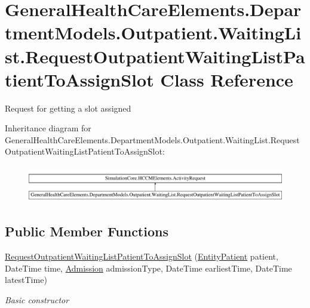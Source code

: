 \hypertarget{class_general_health_care_elements_1_1_department_models_1_1_outpatient_1_1_waiting_list_1_1_reqf0cf500ea28fd461b6ca502bac291525}{}\section{General\+Health\+Care\+Elements.\+Department\+Models.\+Outpatient.\+Waiting\+List.\+Request\+Outpatient\+Waiting\+List\+Patient\+To\+Assign\+Slot Class Reference}
\label{class_general_health_care_elements_1_1_department_models_1_1_outpatient_1_1_waiting_list_1_1_reqf0cf500ea28fd461b6ca502bac291525}


Request for getting a slot assigned  


Inheritance diagram for General\+Health\+Care\+Elements.\+Department\+Models.\+Outpatient.\+Waiting\+List.\+Request\+Outpatient\+Waiting\+List\+Patient\+To\+Assign\+Slot\+:\begin{figure}[H]
\begin{center}
\leavevmode
\includegraphics[height=1.625544cm]{class_general_health_care_elements_1_1_department_models_1_1_outpatient_1_1_waiting_list_1_1_reqf0cf500ea28fd461b6ca502bac291525}
\end{center}
\end{figure}
\subsection*{Public Member Functions}
\begin{DoxyCompactItemize}
\item 
\hyperlink{class_general_health_care_elements_1_1_department_models_1_1_outpatient_1_1_waiting_list_1_1_reqf0cf500ea28fd461b6ca502bac291525_ab0f9201a705bc171eacfcd35a253f651}{Request\+Outpatient\+Waiting\+List\+Patient\+To\+Assign\+Slot} (\hyperlink{class_general_health_care_elements_1_1_entities_1_1_entity_patient}{Entity\+Patient} patient, Date\+Time time, \hyperlink{class_general_health_care_elements_1_1_treatment_admission_types_1_1_admission}{Admission} admission\+Type, Date\+Time earliest\+Time, Date\+Time latest\+Time)
\begin{DoxyCompactList}\small\item\em Basic constructor \end{DoxyCompactList}\end{DoxyCompactItemize}
